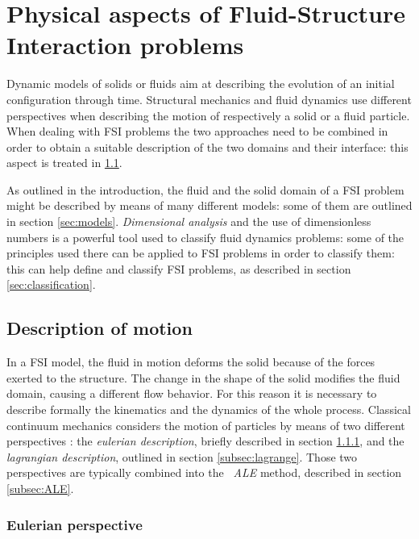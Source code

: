 \chapter{Physical aspects of Fluid-Structure Interaction problems}
\label{cha:physics}


Dynamic models of solids or fluids aim at describing the evolution of an initial configuration through time. Structural mechanics and fluid dynamics use different perspectives when describing the motion of respectively a solid or a fluid particle. When dealing with FSI problems the two approaches need to be combined in order to obtain a suitable description of the two domains and their interface: this aspect is treated in \ref{sec:desc-motion}.

As outlined in the introduction, the fluid and the solid domain of a FSI problem might be described by means of many different models: some of them are outlined in section \ref{sec:models}.  \textit{Dimensional analysis} and the use of dimensionless numbers is a powerful tool used to classify fluid dynamics problems: some of the principles used there can be applied to FSI problems in order to classify them: this can help define and classify FSI problems, as described in section \ref{sec:classification}.

\section{Description of motion}
\label{sec:desc-motion}

In a FSI model, the fluid in motion deforms the solid because of the forces exerted to the structure. The change in the shape of the solid modifies the fluid domain, causing a different flow behavior. For this reason it is necessary to describe formally the kinematics and the dynamics of the whole process. Classical continuum mechanics considers the motion of particles by means of two different perspectives  \cite{batra2006elements}: the \textit{eulerian description}, briefly described in section \ref{subsec:euler}, and the \textit{lagrangian description}, outlined in section \ref{subsec:lagrange}. Those two perspectives are typically combined into the \textit{~\ac{ALE}} method, described in section \ref{subsec:ALE}.

\subsection{Eulerian perspective}
\label{subsec:euler}

